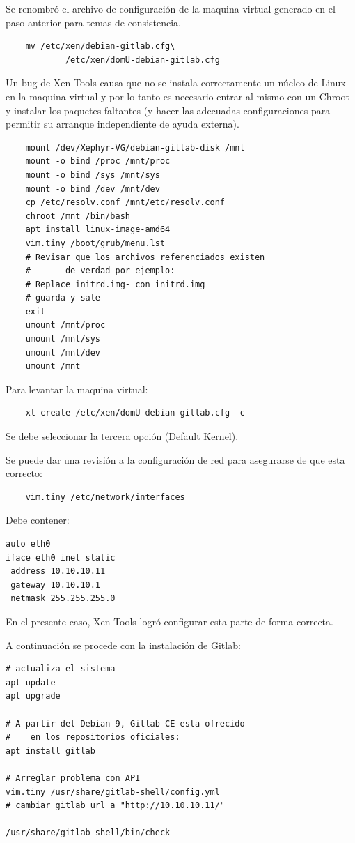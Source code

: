 Se renombró el archivo de configuración de la maquina virtual generado en el paso anterior para temas de consistencia.

\begin{lstlisting}
	mv /etc/xen/debian-gitlab.cfg\
    		/etc/xen/domU-debian-gitlab.cfg
\end{lstlisting}

Un bug de Xen-Tools causa que no se instala correctamente un núcleo de Linux en la maquina virtual y por lo tanto es necesario entrar al mismo con un Chroot y instalar los paquetes faltantes (y hacer las adecuadas configuraciones  para permitir su arranque independiente de ayuda externa).

\begin{lstlisting}
	mount /dev/Xephyr-VG/debian-gitlab-disk /mnt
	mount -o bind /proc /mnt/proc
	mount -o bind /sys /mnt/sys
	mount -o bind /dev /mnt/dev
	cp /etc/resolv.conf /mnt/etc/resolv.conf
	chroot /mnt /bin/bash
	apt install linux-image-amd64
	vim.tiny /boot/grub/menu.lst
	# Revisar que los archivos referenciados existen
	#		de verdad por ejemplo:
	# Replace initrd.img- con initrd.img
    # guarda y sale
	exit
	umount /mnt/proc            
	umount /mnt/sys 
	umount /mnt/dev 
	umount /mnt	
\end{lstlisting}

Para levantar la maquina virtual:

\begin{lstlisting}
	xl create /etc/xen/domU-debian-gitlab.cfg -c
\end{lstlisting}

Se debe seleccionar la tercera opción (Default Kernel).

Se puede dar una revisión a la configuración de red para asegurarse de que esta correcto:

\begin{lstlisting}
	vim.tiny /etc/network/interfaces
\end{lstlisting}

Debe contener:

\begin{lstlisting}
auto eth0
iface eth0 inet static
 address 10.10.10.11
 gateway 10.10.10.1
 netmask 255.255.255.0
\end{lstlisting}

En el presente caso, Xen-Tools logró configurar esta parte de forma correcta.

A continuación se procede con la instalación de Gitlab:

\begin{lstlisting}
# actualiza el sistema
apt update
apt upgrade

# A partir del Debian 9, Gitlab CE esta ofrecido
#    en los repositorios oficiales:
apt install gitlab

# Arreglar problema con API
vim.tiny /usr/share/gitlab-shell/config.yml
# cambiar gitlab_url a "http://10.10.10.11/"

/usr/share/gitlab-shell/bin/check
\end{lstlisting}

